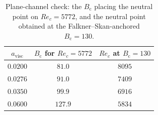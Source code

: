 \begin{table}[tp]
  \centering\small
  \caption{Plane-channel check: the $B_{\mathrm c}$ placing the neutral point
  on $Re_c=5772$, and the neutral point obtained at the
  Falkner--Skan-anchored $B_{\mathrm c}=130$.}
  \label{tab:tschannel}
  \begin{tabular}{ccc}
    \toprule
    $a_{\mathrm{visc}}$ & $B_{\mathrm c}$ for $Re_c\!=\!5772$ & $Re_c$ at $B_{\mathrm c}\!=\!130$\\
    \midrule
    $0.0200$ & $81.0$  & $8095$\\
    $0.0276$ & $91.0$  & $7409$\\
    $0.0350$ & $99.9$  & $6916$\\
    $0.0600$ & $127.9$ & $5834$\\
    \bottomrule
  \end{tabular}
\end{table}
